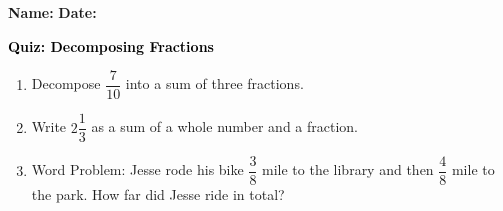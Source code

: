 \documentclass[12pt, letterpaper, fleqn]{article}
\begin{document}
\textbf{Name:} \underline{\hspace{5cm}}
\hfill
\textbf{Date:} \underline{\hspace{3cm}}\\

\begin{tcolorbox}[colback=customteal!20]
    \large\textcolor{black}{\textbf{Quiz: Decomposing Fractions}}
\end{tcolorbox}
\begin{enumerate}[itemsep=3.5cm, leftmargin=0.6cm]
\item Decompose $\dfrac{7}{10}$ into a sum of three fractions.
\vspace{3.5cm}
\item Write $2\dfrac{1}{3}$ as a sum of a whole number and a fraction.
\vspace{3.5cm}
\item Word Problem: Jesse rode his bike $\dfrac{3}{8}$ mile to the library and then $\dfrac{4}{8}$ mile to the park. How far did Jesse ride in total?
\end{enumerate}
\end{document}
